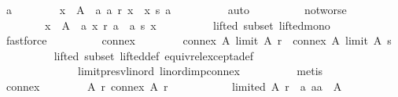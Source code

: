 \begin{isabellebody}
\ a{}{\isacharunderscore}{\kern0pt}{}{\isacharcolon}{\kern0pt}\isanewline
\ \ \ \ \ \ \ \ {\isachardoublequoteopen}{\isasymforall}x\ {\isasymin}\ A\ {\isacharminus}{\kern0pt}\ {\isacharbraceleft}{\kern0pt}a{\isacharbraceright}{\kern0pt}{\isachardot}{\kern0pt}\ {\isasymnot}{\isacharparenleft}{\kern0pt}a\ {\isasympreceq}\isactrlsub r\ x\ {\isasymand}\ x\ {\isasympreceq}\isactrlsub s\ a{\isacharparenright}{\kern0pt}{\isachardoublequoteclose}\isanewline
\ \ \ \ \ \ \ \ \isamarkupfalse%
\ auto\isanewline
\ \ \ \ \ \ \isamarkupfalse%
\ \isamarkupfalse%
\ not{\isacharunderscore}{\kern0pt}worse{\isacharcolon}{\kern0pt}\isanewline
\ \ \ \ \ \ \ \ {\isachardoublequoteopen}{\isasymforall}x\ {\isasymin}\ A\ {\isacharminus}{\kern0pt}\ {\isacharbraceleft}{\kern0pt}a{\isacharbraceright}{\kern0pt}{\isachardot}{\kern0pt}\ {\isasymnot}{\isacharparenleft}{\kern0pt}x\ {\isasympreceq}\isactrlsub r\ a\ {\isasymand}\ a\ {\isasympreceq}\isactrlsub s\ x{\isacharparenright}{\kern0pt}{\isachardoublequoteclose}\isanewline
\ \ \ \ \ \ \ \ \isamarkupfalse%
\ lifted\ subset\ lifted{\isacharunderscore}{\kern0pt}mono\isanewline
\ \ \ \ \ \ \ \ \isamarkupfalse%
\ fastforce\isanewline
\ \ \ \ \ \ \isamarkupfalse%
\ \isamarkupfalse%
\ connex{\isacharcolon}{\kern0pt}\isanewline
\ \ \ \ \ \ \ \ {\isachardoublequoteopen}connex\ A\ {\isacharparenleft}{\kern0pt}limit\ A\ r{\isacharparenright}{\kern0pt}\ {\isasymand}\ connex\ A\ {\isacharparenleft}{\kern0pt}limit\ A\ s{\isacharparenright}{\kern0pt}{\isachardoublequoteclose}\isanewline
\ \ \ \ \ \ \ \ \isamarkupfalse%
\ lifted\ subset\ lifted{\isacharunderscore}{\kern0pt}def\ equiv{\isacharunderscore}{\kern0pt}rel{\isacharunderscore}{\kern0pt}except{\isacharunderscore}{\kern0pt}a{\isacharunderscore}{\kern0pt}def\isanewline
\ \ \ \ \ \ \ \ \ \ \ \ \ \ limit{\isacharunderscore}{\kern0pt}presv{\isacharunderscore}{\kern0pt}lin{\isacharunderscore}{\kern0pt}ord\ lin{\isacharunderscore}{\kern0pt}ord{\isacharunderscore}{\kern0pt}imp{\isacharunderscore}{\kern0pt}connex\isanewline
\ \ \ \ \ \ \ \ \isamarkupfalse%
\ metis\isanewline
\ \ \ \ \ \ \isamarkupfalse%
\ \isamarkupfalse%
\ connex{}{\isacharcolon}{\kern0pt}\isanewline
\ \ \ \ \ \ \ \ {\isachardoublequoteopen}{\isasymforall}A\ r{\isachardot}{\kern0pt}\ connex\ A\ r\ {\isacharequal}{\kern0pt}\isanewline
\ \ \ \ \ \ \ \ \ \ {\isacharparenleft}{\kern0pt}limited\ A\ r\ {\isasymand}\ {\isacharparenleft}{\kern0pt}{\isasymforall}a{\isachardot}{\kern0pt}\ {\isacharparenleft}{\kern0pt}a{\isacharcolon}{\kern0pt}{\isacharcolon}{\kern0pt}{\isacharprime}{\kern0pt}a{\isacharparenright}{\kern0pt}\ {\isasymin}\ A\ {\isasymlongrightarrow}\isanewline

\end{isabellebody}
